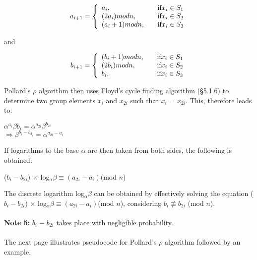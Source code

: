 \documentclass[iwp,first]{luthesis}
\begin{document}
\begin{equation}\label{}
a_{i+1}= \left\{
\begin{array}{l l l}
	a_i, & \quad \textrm{if} x_i \in S_1\\
	(2a_i) modn, & \quad \textrm{if} x_i \in S_2\\
	(a_i + 1) modn, & \quad \textrm{if} x_i \in S_3\\
\end{array} \right.
\end{equation}

and

\begin{equation}\label{}
b_{i+1}= \left\{
\begin{array}{l l l}
	(b_i + 1 )modn, & \quad \textrm{if} x_i \in S_1\\
	(2b_i) modn, & \quad \textrm{if} x_i \in S_2\\
	b_i, & \quad \textrm{if} x_i \in S_3\\
\end{array} \right.
\end{equation}

Pollard's $\rho$ algorithm then uses Floyd's cycle finding algorithm (\S5.1.6) to determine two group elements $x_i$ and $x_{2i}$ such that $x_i$ = $x_{2i}$. This, therefore leads to:

\begin{center}
$\alpha^{a_i}\beta{b_i} = \alpha^{a_{2i}}\beta^{b_{2i}}$
\\
$\Rightarrow \beta^{{b_i}-b_{2_i}} = \alpha^{a_{2i}-{a_i}}$
\end{center}

If logarithms to the base $\alpha$ are then taken from both sides, the following is obtained:

\begin{center}
($b_i -  b_{2i}$) $\times$ log$_{\alpha}\beta \equiv (a_{2i} - a_i)$(mod $n$)
\end{center}

The discrete logarithm log$_{\alpha}\beta$ can be obtained by effectively solving the equation ($b_i -  b_{2i}$) $\times$ log$_{\alpha}\beta \equiv (a_{2i} - a_i)$(mod $n$), considering $b_i \not\equiv b_{2i}$ (mod $n$).
\\
\\
\textbf{Note 5:} $b_i \equiv b_{2i}$ takes place with negligible probability.
\\
\\
The next page illustrates pseudocode for Pollard's $\rho$ algorithm followed by an example. 
\end{document}
